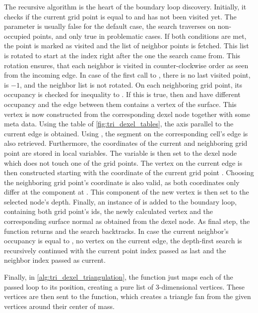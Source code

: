 The recursive  algorithm is the heart of the boundary loop discovery.
Initially, it checks if the current grid point is equal to  and has not been visited yet.
The parameter  is usually false for the default case, \ie the search traverses on non-occupied points, and only true in problematic cases.
If both conditions are met, the point is marked as visited and the list of neighbor points is fetched.
This list is rotated to start at the index right after the one the search came from.
This rotation ensures, that each neighbor is visited in counter-clockwise order as seen from the incoming edge.
In case of the first call to , there is no last visited point,  is $-1$, and the neighbor list is not rotated.
On each neighboring grid point, its occupancy is checked for inequality to .
If this is true, then  and  have different occupancy and the edge between them contains a vertex of the surface.
This vertex is now constructed from the corresponding dexel node together with some meta data.
Using the  table of \cref{fig:tri_dexel_tables}, the axis parallel to the current edge is obtained.
Using , the segment on the corresponding cell's edge is also retrieved.
Furthermore, the coordinates of the current and neighboring grid point are stored in local variables.
The  variable is then set to the dexel node which does not touch one of the grid points.
The vertex on the current edge is then constructed starting with the coordinate of the current grid point .
Choosing the neighboring grid point's coordinate is also valid, as both coordinates only differ at the component at .
This component of the new vertex is then set to the selected node's depth.
Finally, an instance of  is added to the boundary loop, containing both grid point's ids, the newly calculated vertex and the corresponding surface normal as obtained from the dexel node.
As final step, the function returns and the search backtracks.
In case the current neighbor's occupancy is equal to , \ie no vertex on the current edge, the depth-first search is recursively continued with the current point index passed as last and the neighbor index passed as current.

Finally, in \cref{alg:tri_dexel_triangulation}, the  function just maps each  of the passed loop to its position, creating a pure list of 3-dimensional vertices.
These vertices are then sent to the  function, which creates a triangle fan from the given vertices around their center of mass.

